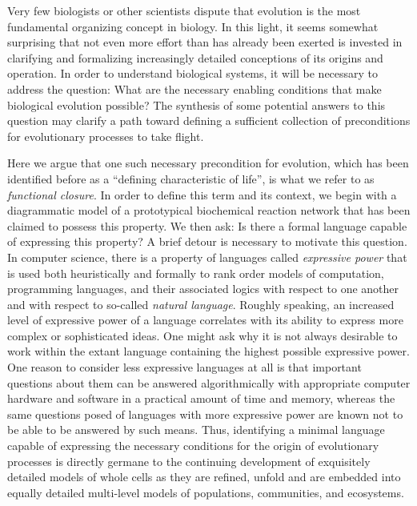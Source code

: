 \documentclass[10pt]{article}
\begin{document}
Very few biologists or other scientists dispute that evolution is the most fundamental organizing concept in biology. In this light, it seems somewhat surprising that not even more effort than has already been exerted is invested in clarifying and formalizing increasingly detailed conceptions of its origins and operation. In order to understand biological systems, it will be necessary to address the question: What are the necessary enabling conditions that make biological evolution possible? The synthesis of some potential answers to this question may clarify a path toward defining a sufficient collection of preconditions for evolutionary processes to take flight.

Here we argue that one such necessary precondition for evolution, which has been identified before as a ``defining characteristic of life'', is what we refer to as \emph{functional closure}. In order to define this term and its context, we begin with a diagrammatic model of a prototypical biochemical reaction network that has been claimed to possess this property. We then ask: Is there a formal language capable of expressing this property? A brief detour is necessary to motivate this question. In computer science, there is a property of languages called \emph{expressive power} that is used both heuristically and formally to rank order models of computation, programming languages, and their associated logics with respect to one another and with respect to so-called \emph{natural language}. Roughly speaking, an increased level of expressive power of a language correlates with its ability to express more complex or sophisticated ideas. One might ask why it is not always desirable to work within the extant language containing the highest possible expressive power. One reason to consider less expressive languages at all is that important questions about them can be answered algorithmically with appropriate computer hardware and software in a practical amount of time and memory, whereas the same questions posed of languages with more expressive power are known not to be able to be answered by such means. Thus, identifying a minimal language capable of expressing the necessary conditions for the origin of evolutionary processes is directly germane to the continuing development of exquisitely detailed models of whole cells as they are refined, unfold and are embedded into equally detailed multi-level models of populations, communities, and ecosystems.
\end{document}
